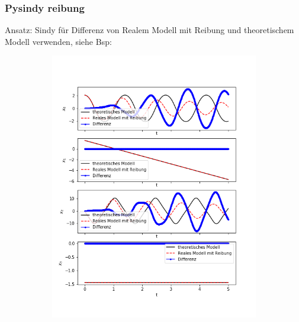 \documentclass[arbeit=studie,oneside,BCOR=12mm]{ArbeitRST}
\begin{document}
\subsubsection{Pysindy reibung}
Ansatz: Sindy für Differenz von Realem Modell mit Reibung und theoretischem Modell verwenden, siehe Bsp:\\
\begin{figure}
\begin{subfigure}[c]{0.5\textwidth}
\includegraphics[width=1\textwidth]{images/pysindy_fric_visk2}
\end{subfigure}
\begin{subfigure}[c]{0.5\textwidth}

\end{subfigure}
\end{figure}
\end{document}
